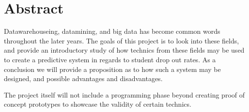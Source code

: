 \section*{Abstract}
	Datawarehouseing, datamining, and big data has become common words throughout the later years. 
	The goals of this project is to look into these fields, and provide an introductory study of how
	technics from these fields may be used to create a predictive system in regards to student drop out rates. 
	As a conclusion we will provide a proposition as to how such a system may be designed, and possible
	advantages and disadvantages.
	
	The project itself will not include a programming phase beyond creating proof of concept prototypes to showcase the validity of certain technics.
	